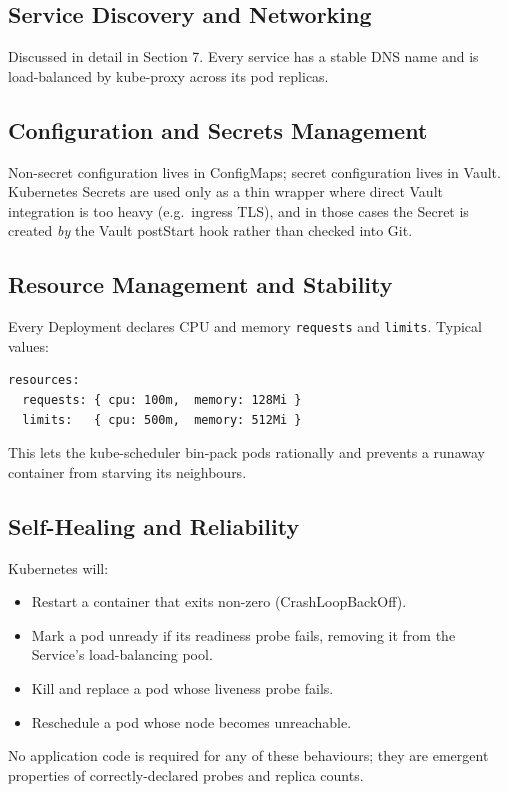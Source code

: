 \documentclass[11pt,a4paper]{article}
\begin{document}
\subsection{Service Discovery and Networking}
Discussed in detail in Section 7.  Every service has a stable DNS
name and is load-balanced by kube-proxy across its pod replicas.

\subsection{Configuration and Secrets Management}
Non-secret configuration lives in ConfigMaps; secret configuration
lives in Vault.  Kubernetes Secrets are used only as a thin wrapper
where direct Vault integration is too heavy (e.g.\ ingress TLS), and
in those cases the Secret is created \emph{by} the Vault postStart
hook rather than checked into Git.

\subsection{Resource Management and Stability}
Every Deployment declares CPU and memory \texttt{requests} and
\texttt{limits}.  Typical values:

\begin{lstlisting}
resources:
  requests: { cpu: 100m,  memory: 128Mi }
  limits:   { cpu: 500m,  memory: 512Mi }
\end{lstlisting}

This lets the kube-scheduler bin-pack pods rationally and prevents a
runaway container from starving its neighbours.

\subsection{Self-Healing and Reliability}
Kubernetes will:

\begin{itemize}[leftmargin=*]
  \item Restart a container that exits non-zero (CrashLoopBackOff).
  \item Mark a pod unready if its readiness probe fails, removing it
        from the Service's load-balancing pool.
  \item Kill and replace a pod whose liveness probe fails.
  \item Reschedule a pod whose node becomes unreachable.
\end{itemize}

No application code is required for any of these behaviours; they
are emergent properties of correctly-declared probes and replica
counts.
\end{document}
